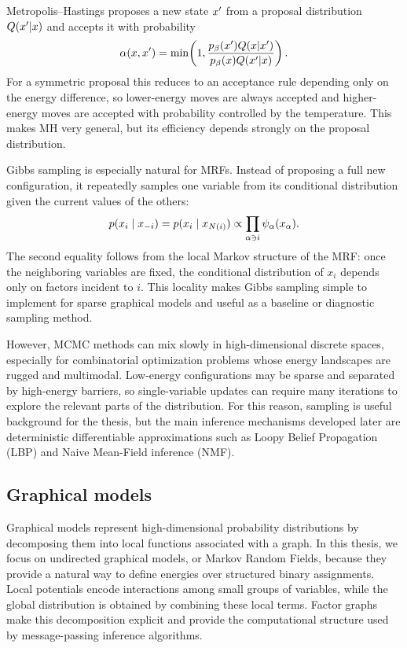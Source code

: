 Metropolis--Hastings proposes a new state $x'$ from a proposal distribution $Q(x'|x)$ and accepts it with probability
\begin{equation}
\alpha(x,x')
=
\min\!\left(
1,
\frac{p_\beta(x')Q(x|x')}{p_\beta(x)Q(x'|x)}
\right).
\end{equation}
For a symmetric proposal this reduces to an acceptance rule depending only on the energy difference, so lower-energy moves are always accepted and higher-energy moves are accepted with probability controlled by the temperature. This makes MH very general, but its efficiency depends strongly on the proposal distribution.

Gibbs sampling is especially natural for MRFs. Instead of proposing a full new configuration, it repeatedly samples one variable from its conditional distribution given the current values of the others:
\begin{equation}
p(x_i \mid x_{-i})
=
p(x_i \mid x_{N(i)})
\propto
\prod_{\alpha \ni i} \psi_{\alpha}(x_{\alpha}).
\end{equation}
The second equality follows from the local Markov structure of the MRF: once the neighboring variables are fixed, the conditional distribution of $x_i$ depends only on factors incident to $i$. This locality makes Gibbs sampling simple to implement for sparse graphical models and useful as a baseline or diagnostic sampling method.

However, MCMC methods can mix slowly in high-dimensional discrete spaces, especially for combinatorial optimization problems whose energy landscapes are rugged and multimodal. Low-energy configurations may be sparse and separated by high-energy barriers, so single-variable updates can require many iterations to explore the relevant parts of the distribution. For this reason, sampling is useful background for the thesis, but the main inference mechanisms developed later are deterministic differentiable approximations such as Loopy Belief Propagation (LBP) and Naive Mean-Field inference (NMF).

\subsection{Graphical models}

Graphical models represent high-dimensional probability distributions by decomposing them into local functions associated with a graph. In this thesis, we focus on undirected graphical models, or Markov Random Fields, because they provide a natural way to define energies over structured binary assignments. Local potentials encode interactions among small groups of variables, while the global distribution is obtained by combining these local terms. Factor graphs make this decomposition explicit and provide the computational structure used by message-passing inference algorithms.

